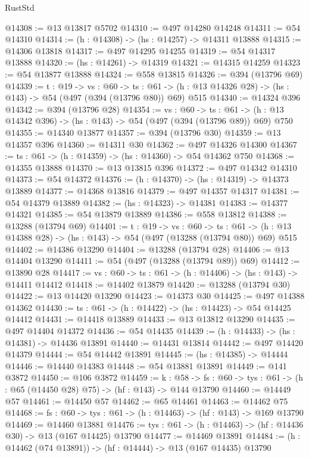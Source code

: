 \begin{lexlean}{RustStd}
\begin{coremodule}
@14308 := @13 @13817 @5702
@14310 := @497 @14280 @14248
@14311 := @54 @14310
@14314 := (h : @14308) -> (hs : @14257) -> @14311 @13888
@14315 := @14306 @13818
@14317 := @497 @14295 @14255
@14319 := @54 @14317 @13888
@14320 := (hs : @14261) -> @14319
@14321 := @14315 @14259
@14323 := @54 @13877 @13888
@14324 := @558 @13815
@14326 := @394 (@13796 @69)
@14339 := {t : @19} ->
  {vs : @60} ->
  {ts : @61} -> (h : @13 @14326 @28) -> (hs : @143) -> @54 (@497 (@394 (@13796 @80)) @69) @515
@14340 := @14324 @396
@14342 := @394 (@13796 @28)
@14354 := {vs : @60} ->
  {ts : @61} -> (h : @13 @14342 @396) -> (hs : @143) -> @54 (@497 (@394 (@13796 @89)) @69) @750
@14355 := @14340 @13877
@14357 := @394 (@13796 @30)
@14359 := @13 @14357 @396
@14360 := @14311 @30
@14362 := @497 @14326 @14300
@14367 := {ts : @61} -> (h : @14359) -> (hs : @14360) -> @54 @14362 @750
@14368 := @14355 @13888
@14370 := @13 @13815 @396
@14372 := @497 @14342 @14310
@14373 := @54 @14372
@14376 := (h : @14370) -> (hs : @14319) -> @14373 @13889
@14377 := @14368 @13816
@14379 := @497 @14357 @14317
@14381 := @54 @14379 @13889
@14382 := (hs : @14323) -> @14381
@14383 := @14377 @14321
@14385 := @54 @13879 @13889
@14386 := @558 @13812
@14388 := @13288 (@13794 @69)
@14401 := {t : @19} ->
  {vs : @60} ->
  {ts : @61} -> (h : @13 @14388 @28) -> (hs : @143) -> @54 (@497 (@13288 (@13794 @80)) @69) @515
@14402 := @14386 @13290
@14404 := @13288 (@13794 @28)
@14406 := @13 @14404 @13290
@14411 := @54 (@497 (@13288 (@13794 @89)) @69)
@14412 := @13890 @28
@14417 := {vs : @60} -> {ts : @61} -> (h : @14406) -> (hs : @143) -> @14411 @14412
@14418 := @14402 @13879
@14420 := @13288 (@13794 @30)
@14422 := @13 @14420 @13290
@14423 := @14373 @30
@14425 := @497 @14388 @14362
@14430 := {ts : @61} -> (h : @14422) -> (hs : @14423) -> @54 @14425 @14412
@14431 := @14418 @13889
@14433 := @13 @13812 @13290
@14435 := @497 @14404 @14372
@14436 := @54 @14435
@14439 := (h : @14433) -> (hs : @14381) -> @14436 @13891
@14440 := @14431 @13814
@14442 := @497 @14420 @14379
@14444 := @54 @14442 @13891
@14445 := (hs : @14385) -> @14444
@14446 := @14440 @14383
@14448 := @54 @13881 @13891
@14449 := @141 @3872
@14450 := @106 @3872
@14459 := {k : @58} ->
  {fs : @60} -> {tys : @61} -> (h : @65 (@14450 @28) @75) -> (hf : @143) -> @144 @13790
@14460 := @14449 @57
@14461 := @14450 @57
@14462 := @65 @14461
@14463 := @14462 @75
@14468 := {fs : @60} -> {tys : @61} -> (h : @14463) -> (hf : @143) -> @169 @13790
@14469 := @14460 @13881
@14476 := {tys : @61} -> (h : @14463) -> (hf : @14436 @30) -> @13 (@167 @14425) @13790
@14477 := @14469 @13891
@14484 := (h : @14462 (@74 @13891)) -> (hf : @14444) -> @13 (@167 @14435) @13790

\end{coremodule}
\end{lexlean}
